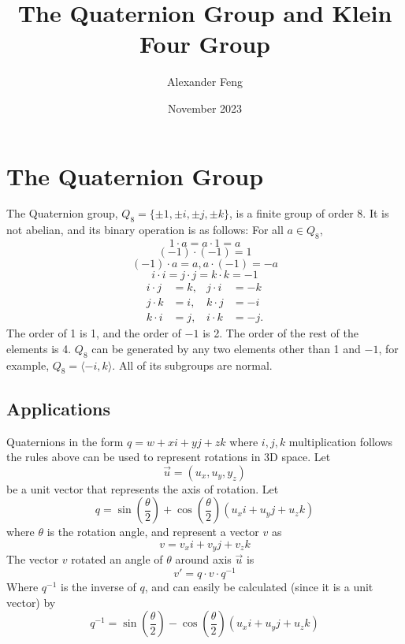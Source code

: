 \documentclass{article}
\title{The Quaternion Group and Klein Four Group}
\author{Alexander Feng}
\date{November 2023}
\begin{document}
\maketitle

\section{The Quaternion Group}
The Quaternion group, $Q_8 = \{\pm 1 , \pm i, \pm j, \pm k \}$, is a finite group of order 8. It is not abelian, and its binary operation is as follows: For all $a \in Q_8$,
$$1 \cdot a = a \cdot 1 =a$$
$$(-1) \cdot (-1) = 1$$
$$(-1 ) \cdot a = a, a\cdot (-1) = -a$$
$$i \cdot i = j \cdot j = k \cdot k = -1 $$
\begin{align*}
i \cdot j &= k, & j \cdot i &= -k \\
j \cdot k &= i, & k \cdot j &= -i \\
k \cdot i &= j, & i \cdot k &= -j.
\end{align*}
The order of 1 is 1, and the order of $-1$ is 2. The order of the rest of the elements is 4. $Q_8$ can be generated by any two elements other than 1 and $-1$, for example, $Q_8 = \langle -i, k \rangle$. All of its subgroups are normal. 

\begin{center}
\end{center}

\subsection*{Applications}
Quaternions in the form $q = w + xi + yj + zk$ where $i, j,k$ multiplication follows the rules above can be used to represent rotations in 3D space. Let 
$$\vec u = (u_x , u_y , y_z)$$
be a unit vector that represents the axis of rotation. Let 
$$q = \sin \left(\frac{\theta}{2} \right) + \cos \left(\frac{\theta}{2} \right) (u_x i + u_y j + u_z k) $$
where $\theta$ is the rotation angle, and represent a vector $v$ as 
$$v = v_x i + v_y j + v_z k$$
The vector $v$ rotated an angle of $\theta$ around axis $\vec u$ is
$$v' = q \cdot v \cdot q^{-1}$$
Where $q^{-1}$ is the inverse of $q$, and can easily be calculated (since it is a unit vector) by
$$q^{-1} = \sin \left(\frac{\theta}{2} \right) - \cos \left(\frac{\theta}{2} \right) (u_x i + u_y j + u_z k) $$
\end{document}
